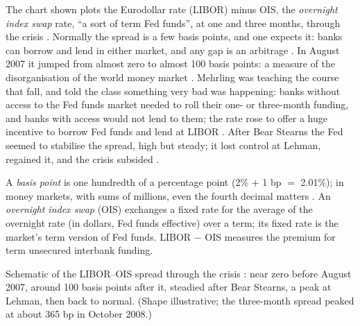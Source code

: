 \begin{paracol}{2}
The chart shown plots the Eurodollar rate (LIBOR) minus OIS, the \emph{overnight index swap} rate, ``a sort of term Fed funds'', at one and three months, through the
crisis . Normally the spread is a few basis points, and one expects it: banks can borrow and lend in either market, and any gap is an
arbitrage . In August 2007 it jumped from almost zero to almost 100 basis points: a measure of the disorganisation of the world money market
. Mehrling was teaching the course that fall, and told the class something very bad was happening: banks without access to the Fed funds market
needed to roll their one- or three-month funding, and banks with access would not lend to them; the rate rose to offer a huge incentive to borrow Fed funds and lend at LIBOR
. After Bear Stearns the Fed seemed to stabilise the spread, high but steady; it lost control at Lehman, regained it, and the crisis
subsided .

\begin{definition}
A \emph{basis point} is one hundredth of a percentage point (2\% $+$ 1 bp $=$ 2.01\%); in money markets, with sums of millions, even the fourth decimal matters
. An \emph{overnight index swap} (OIS) exchanges a fixed rate for the average of the overnight rate (in dollars, Fed funds effective) over a
term; its fixed rate is the market's term version of Fed funds. LIBOR $-$ OIS measures the premium for term unsecured interbank funding.
\end{definition}

\begin{nfigure}
\caption{Schematic of the LIBOR--OIS spread through the crisis : near zero before August 2007, around 100 basis points after it, steadied after Bear
Stearns, a peak at Lehman, then back to normal. (Shape illustrative; the three-month spread peaked at about 365 bp in October 2008.)}\label{fig:ed-libor}
\end{nfigure}


\end{paracol}
